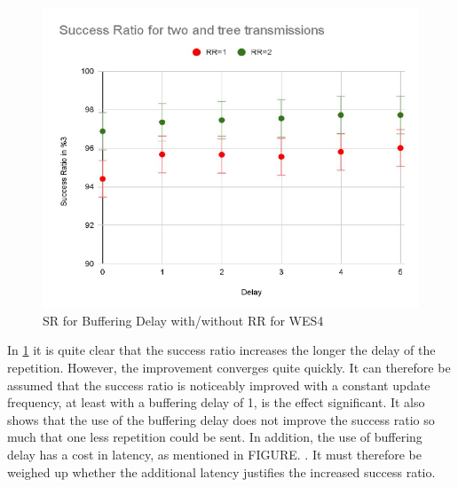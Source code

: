 \begin{figure}[h]
	\centering
	\includegraphics[scale=0.8]{figures/bufferingDelay.pdf}
	\caption{SR for Buffering Delay with/without RR for WES4}
	\label{fig:bufferingDelay}
\end{figure}

In \cref{fig:bufferingDelay} it is quite clear that the success ratio increases the longer the delay of the repetition.
However, the improvement converges quite quickly.
It can therefore be assumed that the success ratio is noticeably improved with a constant update frequency, 
at least with a buffering delay of 1, is the effect significant. 
It also shows that the use of the buffering delay does not improve the success ratio so much 
that one less repetition could be sent.
In addition, the use of buffering delay has a cost in latency, as mentioned in FIGURE. .
It must therefore be weighed up whether the additional latency justifies the increased success ratio.



